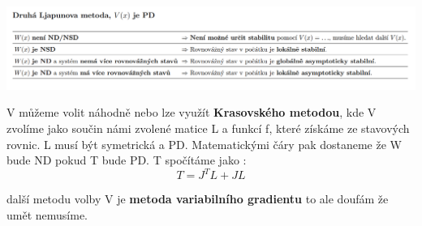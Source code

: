 \includegraphics[scale = 0.6]{img/Ljap.2.png}

V můžeme volit náhodně nebo lze využít {\bf Krasovského metodou}, kde V zvolíme jako součin námi zvolené matice L a funkcí f, které získáme ze stavových rovnic.
L musí být symetrická a PD. Matematickými čáry pak dostaneme že W bude ND pokud T bude PD.
T spočítáme jako :
\begin{equation*}
    T=J^TL+JL
\end{equation*}

další metodu volby V je {\bf metoda variabilního gradientu } to ale doufám že umět nemusíme.

